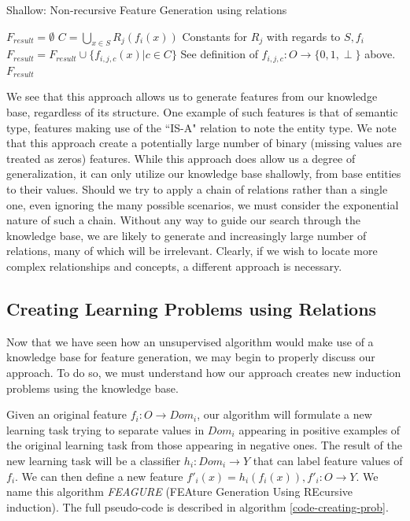 \documentclass[twoside,11pt]{article}
\theoremstyle{definition}
\begin{document}
\begin{algorithm}[H]
	\caption{Shallow: Non-recursive Feature Generation using relations}
	\label{code-compete}
	\small
	\begin{algorithmic}
		\State $F_{result}=\emptyset$
		\State $C=\bigcup_{x\in S} R_j(f_i(x))$ \Comment Constants for $R_j$ with regards to $S, f_i$
		\State  $F_{result}=F_{result}\cup \{f_{i,j,c}(x)|c\in C\}$ \Comment See definition of $f_{i,j,c}:O\rightarrow \{0,1,\perp\}$ above.
		\EndFor
		\EndFor
		\State \Return $F_{result}$ 
		\EndFunction
		
	\end{algorithmic}
\end{algorithm}

We see that this approach allows us to generate features from our knowledge base, regardless of its structure. One example of such features is that of semantic type, features making use of the ``IS-A" relation to note the entity type. We note that this approach create a potentially large number of binary (missing values are treated as zeros) features. While this approach does allow us a degree of generalization, it can only utilize our knowledge base shallowly, from base entities to their values. 
Should we try to apply a chain of relations rather than a single one, even ignoring the many possible scenarios, we must consider the exponential nature of such a chain. Without any way to guide our search through the knowledge base, we are likely to generate and increasingly large number of relations, many of which will be irrelevant. Clearly, if we wish to locate more complex relationships and concepts, a different approach is necessary.

\subsection{Creating Learning Problems using Relations} \label{algorithm_section} 

Now that we have seen how an unsupervised algorithm would make use of a knowledge base for feature generation, we may begin to properly discuss our approach. To do so, we must understand how our approach creates new induction problems using the knowledge base.

Given an original feature $f_{i}:O\rightarrow Dom_i$, our algorithm will formulate a new learning task trying to separate values in $Dom_i$ appearing in positive examples of the original learning task from those appearing in negative ones.  The result of the new learning task will be a classifier
$h_{i}:Dom_{i}\rightarrow Y$ that can label feature values of $f_{i}$. We can then define a new feature $f'_{i}(x)=h_{i}(f_{i}(x)), f'_{i}:O\rightarrow Y$.
We name this algorithm \emph{FEAGURE} (FEAture Generation Using REcursive induction). The full pseudo-code is described in algorithm \ref{code-creating-prob}.
\end{document}
